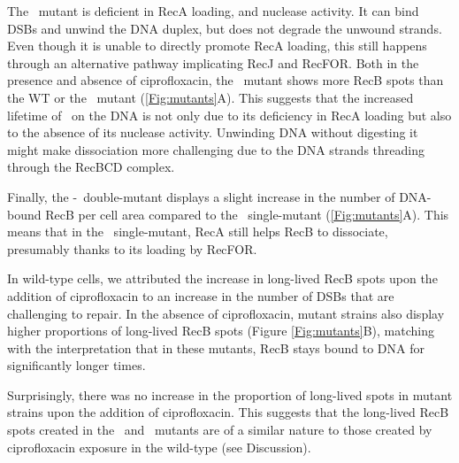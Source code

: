 The \teneighty\ mutant is deficient in RecA loading, and nuclease activity.\cite{} It can bind DSBs and unwind the DNA duplex, but does not degrade the unwound strands. Even though it is unable to directly promote RecA loading, this still happens through an alternative pathway implicating RecJ and RecFOR.\cite{} Both in the presence and absence of ciprofloxacin, the \teneighty\ mutant shows more RecB spots than the WT or the \dreca\ mutant (\ref{Fig:mutants}A). This suggests that the increased lifetime of \teneighty\ on the DNA is not only due to its deficiency in RecA loading but also to the absence of its nuclease activity. Unwinding DNA without digesting it might make dissociation more challenging due to the DNA strands threading through the RecBCD complex.

Finally, the \dreca-\teneighty\ double-mutant displays a slight increase in the number of DNA-bound RecB per cell area compared to the \teneighty\ single-mutant (\ref{Fig:mutants}A). This means that in the \teneighty\ single-mutant, RecA still helps RecB to dissociate, presumably thanks to its loading by RecFOR.

In wild-type cells, we attributed the increase in long-lived RecB spots upon the addition of ciprofloxacin to an increase in the number of DSBs that are challenging to repair. In the absence of ciprofloxacin, mutant strains also display higher proportions of long-lived RecB spots (Figure \ref{Fig:mutants}B), matching with the interpretation that in these mutants, RecB stays bound to DNA for significantly longer times.

Surprisingly, there was no increase in the proportion of long-lived spots in mutant strains upon the addition of ciprofloxacin. This suggests that the long-lived RecB spots created in the \dreca\ and \teneighty\ mutants are of a similar nature to those created by ciprofloxacin exposure in the wild-type (see Discussion).


